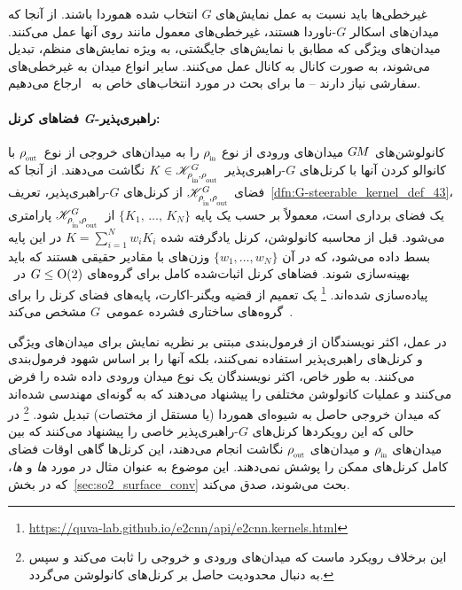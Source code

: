 غیرخطی‌ها باید نسبت به عمل نمایش‌های $G$ انتخاب شده هموردا باشند.
از آنجا که میدان‌های اسکالر $G$-ناوردا هستند، غیرخطی‌های معمول مانند  روی آنها عمل می‌کنند.
میدان‌های ویژگی که مطابق با نمایش‌های جایگشتی، به ویژه نمایش‌های منظم، تبدیل می‌شوند، به صورت کانال به کانال عمل می‌کنند.
سایر انواع میدان به غیرخطی‌های سفارشی نیاز دارند -- ما برای بحث در مورد انتخاب‌های خاص به~\cite{Weiler2019_E2CNN} ارجاع می‌دهیم.

\paragraph{فضاهای کرنل \textit{G}-راهبری‌پذیر:}
کانولوشن‌های $G\mkern-1.4muM$ میدان‌های ورودی از نوع $\rhoin$ را به میدان‌های خروجی از نوع~$\rhoout$ با کانوالو کردن آنها با کرنل‌های $G$-راهبری‌پذیر~$K\in\KG$ نگاشت می‌دهند.
از آنجا که فضای $\KG$ از کرنل‌های $G$-راهبری‌پذیر، تعریف~\ref{dfn:G-steerable_kernel_def_43}، یک فضای برداری است، معمولاً بر حسب یک پایه $\{K_1,\,\dots,\,K_N\}$ از~$\KG$ پارامتری می‌شود.
قبل از محاسبه کانولوشن، کرنل یادگرفته شده $K = \sum_{i=1}^N w_i K_i$ در این پایه بسط داده می‌شود، که در آن $\{w_1,\dots,w_N\}$ وزن‌های با مقادیر حقیقی هستند که باید بهینه‌سازی شوند.
فضاهای کرنل اثبات‌شده کامل برای گروه‌های $G\leq\operatorname{O}(2)$ در~\cite{Weiler2019_E2CNN} پیاده‌سازی شده‌اند.%
\footnote{\url{https://quva-lab.github.io/e2cnn/api/e2cnn.kernels.html}}
یک تعمیم از قضیه ویگنر-اکارت، پایه‌های فضای کرنل را برای گروه‌های ساختاری فشرده عمومی~$G$ مشخص می‌کند~\cite{lang2020WignerEckart}.

در عمل، اکثر نویسندگان از فرمول‌بندی مبتنی بر نظریه نمایش برای میدان‌های ویژگی و کرنل‌های راهبری‌پذیر استفاده نمی‌کنند، بلکه آنها را بر اساس شهود فرمول‌بندی می‌کنند.
به طور خاص، اکثر نویسندگان یک نوع میدان ورودی داده شده را فرض می‌کنند و عملیات کانولوشن مختلفی را پیشنهاد می‌دهند که به گونه‌ای مهندسی شده‌اند که میدان خروجی حاصل به شیوه‌ای هموردا (یا مستقل از مختصات) تبدیل شود.%
\footnote{
	این برخلاف رویکرد ماست که میدان‌های ورودی و خروجی را ثابت می‌کند و سپس به دنبال محدودیت حاصل بر کرنل‌های کانولوشن می‌گردد.
}
در حالی که این رویکردها کرنل‌های $G$-راهبری‌پذیر خاصی را پیشنهاد می‌کنند که بین میدان‌های $\rhoin$ و میدان‌های $\rhoout$ نگاشت انجام می‌دهند، این کرنل‌ها گاهی اوقات فضای کامل کرنل‌های ممکن را پوشش نمی‌دهند.
این موضوع به عنوان مثال در مورد \emph{ها} و \emph{ها}، که در بخش~\ref{sec:so2_surface_conv} بحث می‌شوند، صدق می‌کند.